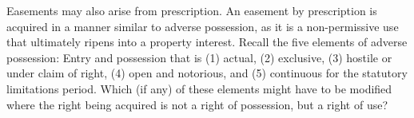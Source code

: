 
Easements may also arise from prescription. An easement by prescription is
acquired in a manner similar to adverse possession, as it is a non-permissive
use that ultimately ripens into a property interest. Recall the five elements of
adverse possession: Entry and possession that is (1) actual, (2) exclusive, (3)
hostile or under claim of right, (4) open and notorious, and (5) continuous for
the statutory limitations period. Which (if any) of these elements might have to
be modified where the right being acquired is not a right of possession, but a
right of use?

